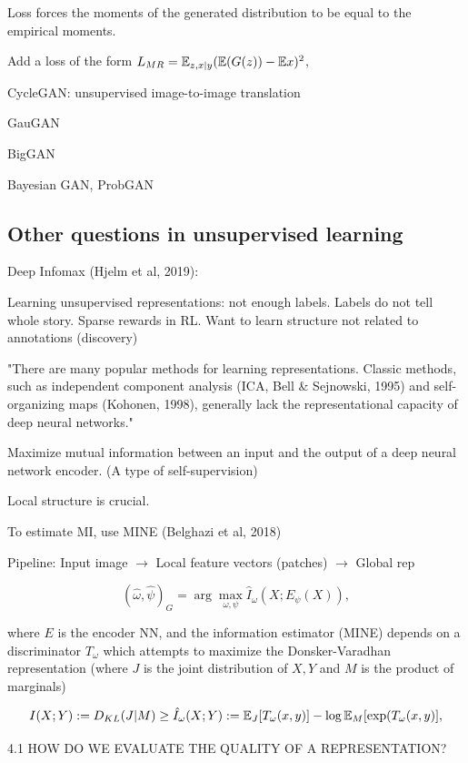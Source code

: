 \documentclass[english]{article}
\begin{document}
Loss forces the moments of the generated distribution to be equal to the empirical moments. 

Add a loss of the form $L_{MR} = \mathbb{E}_{z,x|y}(\mathbb{E}(G(z)) - \mathbb{E} x)^2$,

\item 

CycleGAN: unsupervised image-to-image translation

GauGAN

BigGAN
 
Bayesian GAN, ProbGAN

\eenum 

\subsection{Other questions in unsupervised learning}

\benum 
\item Deep Infomax (Hjelm et al, 2019): 

Learning unsupervised representations: not enough labels. Labels do not tell whole story. Sparse rewards in RL. Want to learn structure not related to annotations (discovery)

"There are many popular methods for learning representations. Classic methods, such as independent
component analysis (ICA, Bell \& Sejnowski, 1995) and self-organizing maps (Kohonen, 1998),
generally lack the representational capacity of deep neural networks."



Maximize mutual information between an input and the output of a deep neural network encoder. (A type of self-supervision)

Local structure is crucial. 

To estimate MI, use MINE (Belghazi et al, 2018)

Pipeline: Input image $\to$ Local feature vectors (patches) $\to$ Global rep

$$(\hat \omega,\hat \psi)_G 
= \arg\max_{\omega,\psi}
\hat I_{\omega}(X;E_\psi(X)),$$ 

where $E$ is the encoder NN, and the information estimator (MINE) depends on a discriminator $T_\omega$ which attempts to maximize the Donsker-Varadhan representation (where $J$ is the joint distribution of $X,Y$ and $M$ is the product of marginals)

$$I(X;Y) := D_{KL}(J|M) \ge \hat I_\omega(X;Y) 
:= \mathbb{E}_J[T_\omega (x,y)] - \log \mathbb{E}_M [\exp(T_\omega(x,y)],$$ 

4.1 HOW DO WE EVALUATE THE QUALITY OF A REPRESENTATION?
\end{document}
